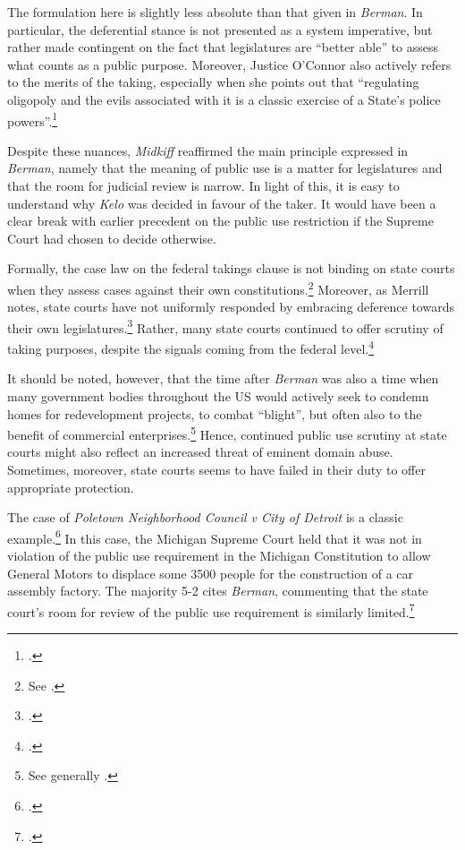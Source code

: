 The formulation here is slightly less absolute than that given in {\it Berman}. In particular, the deferential stance is not presented as a system imperative, but rather made contingent on the fact that legislatures are ``better able'' to assess what counts as a public purpose. Moreover, Justice O'Connor also actively refers to the merits of the taking, especially when she points out that  ``regulating oligopoly and the evils associated with it is a classic exercise of a State's police powers''.\footcite[242]{hawaii84}

Despite these nuances, {\it Midkiff} reaffirmed the main principle expressed in {\it Berman}, namely that the meaning of public use is a matter for legislatures and that the room for judicial review is narrow. In light of this, it is easy to understand why {\it Kelo} was decided in favour of the taker. It would have been a clear break with earlier precedent on the public use restriction if the Supreme Court had chosen to decide otherwise. 

Formally, the case law on the federal takings clause is not binding on state courts when they assess cases against their own constitutions.\footnote{See \cite[95]{merrill86}.} Moreover, as Merrill notes, state courts have not uniformly responded by embracing deference towards their own legislatures.\footcite[65]{merrill86} Rather, many state courts continued to offer scrutiny of taking purposes, despite the signals coming from the federal level.\footcite[65]{merrill86}

It should be noted, however, that the time after {\it Berman} was also a time when many government bodies throughout the US would actively seek to condemn homes for redevelopment projects, to combat ``blight'', but often also to the benefit of commercial enterprises.\footnote{See generally \cite{pritchett03}.} Hence, continued public use scrutiny at state courts might also reflect an increased threat of eminent domain abuse. Sometimes, moreover, state courts seems to have failed in their duty to offer appropriate protection.

The case of {\it Poletown Neighborhood Council v City of Detroit} is a classic example.\footcite{poletown81} In this case, the Michigan Supreme Court held that it was not in violation of the public use requirement in the Michigan Constitution to allow General Motors to displace some 3500 people for the construction of a car assembly factory. The majority 5-2 cites {\it Berman}, commenting that the state court's room for review of the public use requirement is similarly limited.\footcite[632-633]{poletown81}

